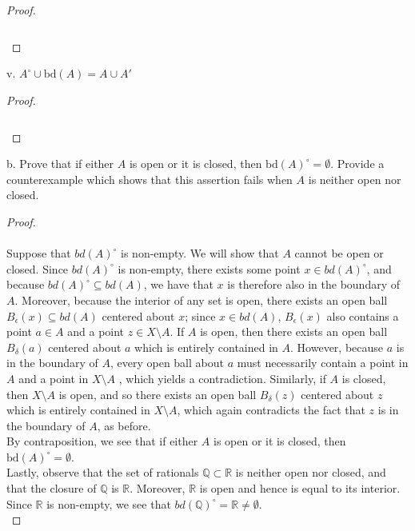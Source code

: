 \begin{proof}\renewcommand{\qedsymbol}{}\ \\\\
    \begin{align*}
    \end{align*}
\end{proof}

\pagebreak


v. $A^{\circ} \cup \text{bd}(A) = A \cup A'$ \ \\
    
\begin{proof}\renewcommand{\qedsymbol}{}\ \\\\
    \begin{align*}
    \end{align*}
\end{proof}

\pagebreak

b. Prove that if either $A$ is open or it is closed, then $\text{bd}(A)^{\circ} = \emptyset$. Provide a counterexample
   which shows that this assertion fails when $A$ is neither open nor closed. \ \\
    
\begin{proof}\ \\\\
    Suppose that $bd(A)^{\circ}$ is non-empty. We will show that $A$ cannot be open or closed. Since $bd(A)^{\circ}$ is 
    non-empty, there exists some point $x \in bd(A)^{\circ}$, and because $bd(A)^{\circ} \subseteq bd(A)$, we have that
    $x$ is therefore also in the boundary of $A$. Moreover, because the interior of any set is open, there exists an 
    open ball $B_{\epsilon}(x) \subseteq bd(A)$ centered about $x$; since $x \in bd(A)$, $B_{\epsilon}(x)$ also 
    contains a point $a \in A$ and a point $z \in X \setminus A$. If $A$ is open, then there exists an open ball 
    $B_{\delta}(a)$ centered about $a$ which is entirely contained in $A$. However, because $a$ is in the boundary of 
    $A$, every open ball about $a$ must necessarily contain a point in $A$ and a point in $X \setminus A$ , which 
    yields a contradiction. Similarly, if $A$ is closed, then $X \setminus A$ is open, and so there exists an open ball
    $B_{\delta}(z)$ centered about $z$ which is entirely contained in $X \setminus A$, which again contradicts the fact 
    that $z$ is in the boundary of $A$, as before. \\

    By contraposition, we see that if either $A$ is open or it is closed, then $\text{bd}(A)^{\circ} = \emptyset$. \\

    Lastly, observe that the set of rationals $\mathbb{Q} \subset \mathbb{R}$ is neither open nor closed, and that the
    closure of $\mathbb{Q}$ is $\mathbb{R}$. Moreover, $\mathbb{R}$ is open and hence is equal to its interior. Since
    $\mathbb{R}$ is non-empty, we see that $bd(\mathbb{Q})^{\circ} = \mathbb{R} \neq \emptyset$.
    \ \\
\end{proof}

\pagebreak